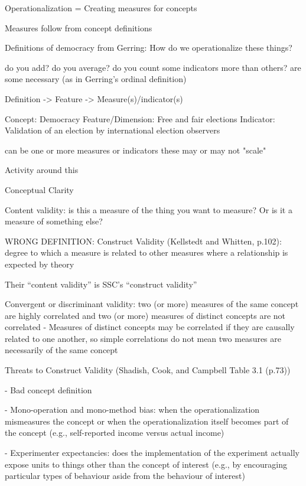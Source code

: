 Operationalization = Creating measures for concepts






Measures follow from concept definitions

Definitions of democracy from Gerring: How do we operationalize these things?

do you add? do you average? do you count some indicators more than others? are some necessary (as in Gerring's ordinal definition)





Definition -> Feature -> Measure(s)/indicator(s)

Concept: Democracy
Feature/Dimension: Free and fair elections
Indicator: Validation of an election by international election observers


can be one or more measures or indicators
these may or may not "scale"






Activity around this



Conceptual Clarity 

Content validity: is this a measure of the thing you want to measure? Or is it a measure of something else?

WRONG DEFINITION: Construct Validity (Kellstedt and Whitten, p.102): degree to which a measure is related to other measures where a relationship is expected by theory

Their ``content validity'' is SSC's ``construct validity''

Convergent or discriminant validity: two (or more) measures of the same concept are highly correlated and two (or more) measures of distinct concepts are not correlated
 - Measures of distinct concepts may be correlated if they are causally related to one another, so simple correlations do not mean two measures are necessarily of the same concept


Threats to Construct Validity (Shadish, Cook, and Campbell Table 3.1 (p.73))

- Bad concept definition

- Mono-operation and mono-method bias: when the operationalization mismeasures the concept or when the operationalization itself becomes part of the concept (e.g., self-reported income versus actual income)

- Experimenter expectancies: does the implementation of the experiment actually expose units to things other than the concept of interest (e.g., by encouraging particular types of behaviour aside from the behaviour of interest)

